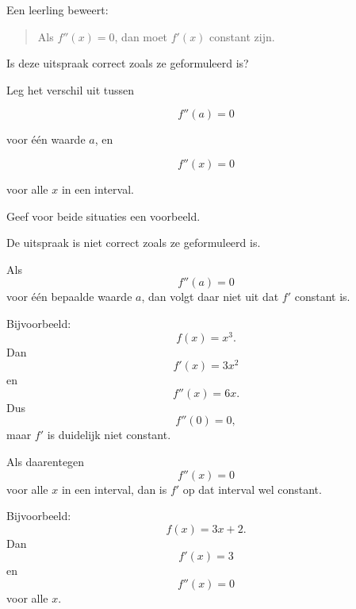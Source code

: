 \documentclass{ximera}
\begin{document}

\begin{oefening}{\oefG}

Een leerling beweert:

\begin{quote}
Als $f''(x)=0$, dan moet $f'(x)$ constant zijn.
\end{quote}

\begin{question}
Is deze uitspraak correct zoals ze geformuleerd is?
\end{question}

\begin{question}
Leg het verschil uit tussen

\[
f''(a)=0
\]

voor één waarde $a$, en

\[
f''(x)=0
\]

voor alle $x$ in een interval.
\end{question}

\begin{question}
Geef voor beide situaties een voorbeeld.
\end{question}

\begin{oplossing}

De uitspraak is niet correct zoals ze geformuleerd is.

Als
\[
f''(a)=0
\]
voor één bepaalde waarde $a$, dan volgt daar niet uit dat $f'$ constant is.

Bijvoorbeeld:
\[
f(x)=x^3.
\]
Dan
\[
f'(x)=3x^2
\]
en
\[
f''(x)=6x.
\]
Dus
\[
f''(0)=0,
\]
maar $f'$ is duidelijk niet constant.

Als daarentegen
\[
f''(x)=0
\]
voor alle $x$ in een interval, dan is $f'$ op dat interval wel constant.

Bijvoorbeeld:
\[
f(x)=3x+2.
\]
Dan
\[
f'(x)=3
\]
en
\[
f''(x)=0
\]
voor alle $x$.

\end{oplossing}

\end{oefening}


\end{document}
